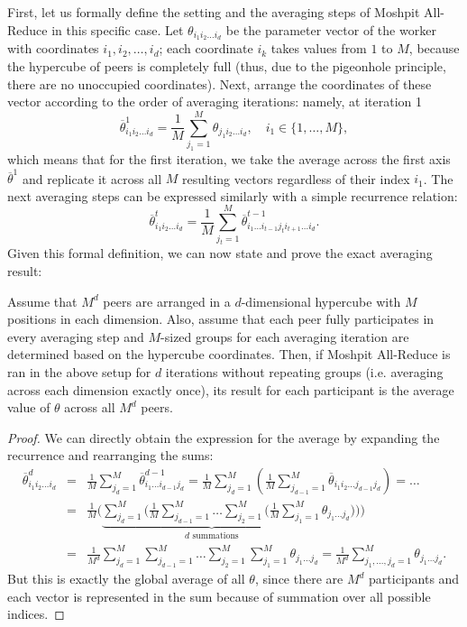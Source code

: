 First, let us formally define the setting and the averaging steps of Moshpit All-Reduce in this specific case. Let $\theta_{i_1 i_2\ldots i_d}$ be the parameter vector of the worker with coordinates $i_1, i_2,\ldots, i_d$; each coordinate $i_k$ takes values from $1$ to $M$, because the hypercube of peers is completely full (thus, due to the pigeonhole principle, there are no unoccupied coordinates). Next, arrange the coordinates of these vector according to the order of averaging iterations: namely, at iteration 1
\begin{equation}
    \overline{\theta}_{i_1 i_2\ldots  i_d}^1=\frac{1}{M}\sum_{j_1=1}^M \theta_{j_1 i_2\ldots i_d},\quad  i_1\in\{1,\ldots,M\},
\end{equation}
which means that for the first iteration, we take the average across the first axis $\overline{\theta}^1$ and replicate it across all $M$ resulting vectors regardless of their index $i_1$. The next averaging steps can be expressed similarly with a simple recurrence relation:
\begin{equation}
\label{eqn:avg_recurrence}
    \overline{\theta}_{i_1 i_2 \ldots i_d}^t=\frac{1}{M}\sum_{j_t=1}^M \overline{\theta}_{i_1\ldots i_{t-1} j_t i_{t+1}\ldots i_d}^{t-1}.
\end{equation}
Given this formal definition, we can now state and prove the exact averaging result:
\begin{theorem}
Assume that $M^d$ peers are arranged in a $d$-dimensional hypercube with $M$ positions in each dimension. Also, assume that each peer fully participates in every averaging step and $M$-sized groups for each averaging iteration are determined based on the hypercube coordinates. Then, if Moshpit All-Reduce is ran in the above setup for $d$ iterations without repeating groups (i.e. averaging across each dimension exactly once), its result for each participant is the average value of $\theta$ across all $M^d$ peers.
\end{theorem}
\begin{proof}
We can directly obtain the expression for the average by expanding the recurrence and rearranging the sums:
\begin{eqnarray*}
    \overline{\theta}_{i_1 i_2\ldots i_d}^d &=& \frac{1}{M}\sum_{j_d=1}^M\overline{\theta}_{i_1\ldots i_{d-1} j_d}^{d-1}=\frac{1}{M}\sum_{j_d=1}^M\left(\frac{1}{M}\sum_{j_{d-1}=1}^M \overline{\theta}_{i_1 i_2\ldots j_{d-1}j_d}\right)=\ldots\\
    &=& \frac{1}{M}\Bigg(\underbrace{\sum_{j_d=1}^M\Bigg(\frac{1}{M}\sum_{j_{d-1}=1}^M\ldots\sum_{j_2=1}^M\Bigg(\frac{1}{M}\sum_{j_1=1}^M}_{d\textrm{ summations}} \theta_{j_1 \ldots j_d}\Bigg)\Bigg)\Bigg)\\
    &=& \frac{1}{M^d}\sum_{j_d=1}^M\sum_{j_{d-1}=1}^M\ldots\sum_{j_2=1}^M\sum_{j_1=1}^M \theta_{j_1 \ldots j_d} =\frac{1}{M^d}\sum_{j_1, \ldots, j_d=1}^M  \theta_{j_1 \ldots j_d}.
\end{eqnarray*}
But this is exactly the global average of all $\theta$, since there are $M^d$ participants and each vector is represented in the sum because of summation over all possible indices.
\end{proof}

